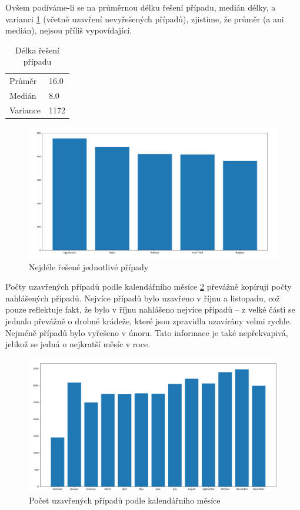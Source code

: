 \documentclass{article}
\begin{document}
Ovšem podíváme-li se na průměrnou délku řešení případu, medián délky, a varianci
\ref{tab:avg_clearance} (včetně uzavření nevyřešených případů), zjistíme, že průměr (a ani medián),
nejsou příliš vypovídající.

\begin{table}
  \centering
  \caption{Délka řešení případu}
  \label{tab:avg_clearance}
  \begin{tabular}{ |l|l| }
  \hline
      Průměr & 16.0 \\
      Medián & 8.0 \\
      Variance & 1172 \\
  \hline
  \end{tabular}
\end{table}

\begin{figure}
  \centering
  \includegraphics[width=1.4\textwidth]{figures/top_clearance_times.png}
  \caption{Nejdéle řešené jednotlivé případy}
  \label{fig:top_clearance_times}
\end{figure}

Počty uzavřených případů podle kalendářního měsíce \ref{fig:clearance_by_month} převážně kopírují
počty nahlášených případů. Nejvíce případů bylo uzavřeno v říjnu a listopadu, což pouze reflektuje
fakt, že bylo v říjnu nahlášeno nejvíce případů -- z velké části se jednalo převážně o drobné krádeže,
které jsou zpravidla uzavírány velmi rychle. Nejméně případů bylo vyřešeno v únoru. Tato informace
je také nepřekvapivá, jelikož se jedná o nejkratší měsíc v roce.

\begin{figure}
  \centering
  \includegraphics[width=1.4\textwidth]{figures/clearance_by_month.png}
  \caption{Počet uzavřených případů podle kalendářního měsíce}
  \label{fig:clearance_by_month}
\end{figure}
\end{document}
